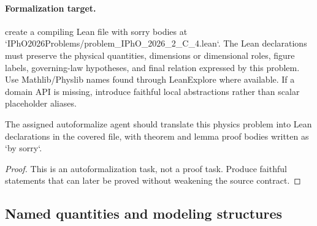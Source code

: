 \paragraph{Formalization target.}
create a compiling Lean file with sorry bodies at `IPhO2026Problems/problem\_IPhO\_2026\_2\_C\_4.lean`.
The Lean declarations must preserve the physical quantities, dimensions or dimensional roles, figure labels, governing-law hypotheses, and final relation expressed by this problem.
Use Mathlib/Physlib names found through LeanExplore where available. If a domain API is missing, introduce faithful local abstractions rather than scalar placeholder aliases.

\begin{theorem}
\label{thm:physics:IPhO_2026_2_C_4:target}
The assigned autoformalize agent should translate this physics problem into Lean declarations in the covered file, with theorem and lemma proof bodies written as `by sorry`.
\end{theorem}
\begin{proof}
This is an autoformalization task, not a proof task. Produce faithful statements that can later be proved without weakening the source contract.
\end{proof}


\subsection*{Named quantities and modeling structures}

